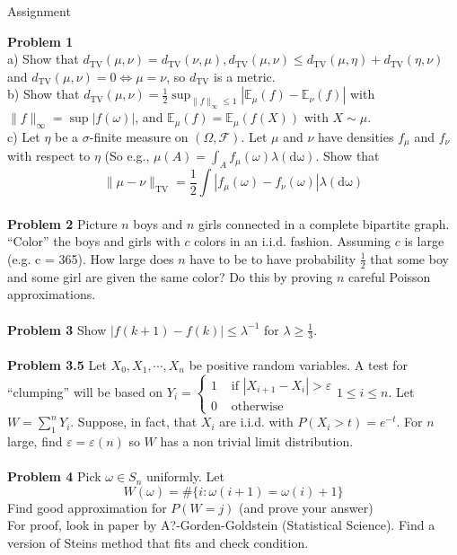 \documentclass[12pt]{article}
\begin{document}
\begin{center}
Assignment
\end{center}
\textbf{Problem 1}\\
a) Show that $d_{\text{TV}}(\mu, \nu) = d_{\text{TV}}(\nu, \mu), d_{\text{TV}}(\mu, \nu) \leqslant d_{\text{TV}}(\mu, \eta) + d_{\text{TV}}(\eta, \nu)$ and $d_{\text{TV}}(\mu, \nu) = 0 \Leftrightarrow \mu = \nu$, so $d_{\text{TV}}$ is a metric.\\
b) Show that $d_{\text{TV}}(\mu, \nu) = \frac{1}{2}\sup_{\|f\|_{\infty} \leqslant 1}|\mathbb{E}_{\mu}(f) - \mathbb{E}_{\nu}(f)|$ with $\|f\|_{\infty} = \sup|f(\omega)|$, and $\mathbb{E}_{\mu}(f) = \mathbb{E}_{\mu}\left(f(X)\right)$ with $X \sim \mu$.\\
c) Let $\eta$ be a $\sigma$-finite measure on $(\Omega, \mathcal{F})$. Let $\mu$ and $\nu$ have densities $f_{\mu}$ and $f_{\nu}$ with respect to $\eta$ (So e.g., $\mu(A) = \int_A f_{\mu}(\omega) \lambda(\mathrm{d\omega})$. Show that
$$\|\mu - \nu\|_{\text{TV}} = \frac{1}{2}\int|f_{\mu}(\omega) - f_{\nu}(\omega)|\lambda(\mathrm{d\omega})$$
\\
\textbf{Problem 2} Picture $n$ boys and $n$ girls connected in a complete bipartite graph. ``Color'' the boys and girls with $c$ colors in an i.i.d. fashion. Assuming $c$ is large (e.g. c = 365). How large does $n$ have to be to have probability $\frac{1}{2}$ that some boy and some girl are given the same color? Do this by proving $n$ careful Poisson approximations.\\
\\
\textbf{Problem 3} Show $|f(k + 1) - f(k)| \leqslant \lambda^{-1}$ for $\lambda \geqslant \frac{1}{3}$.\\
\\
\textbf{Problem 3.5} Let $X_0, X_1, \cdots, X_n$ be positive random variables. A test for ``clumping'' will be based on $Y_i = \begin{cases}
1 & \text{ if }|X_{i + 1} - X_i| > \varepsilon\\
	0 & \text{ otherwise}
\end{cases}
1 \leqslant i \leqslant n$. Let $W = \sum_1^n Y_i$. Suppose, in fact, that $X_i$ are i.i.d. with $P(X_i > t) = e^{-t}$. For $n$ large, find $\varepsilon = \varepsilon(n)$ so $W$ has a non trivial limit distribution.\\
\\
\textbf{Problem 4} Pick $\omega \in S_n$ uniformly. Let
$$W(\omega) = \#\{i: \omega(i + 1) = \omega(i) + 1\}$$
Find good approximation for $P(W = j)$ (and prove your answer)\\
For proof, look in paper by A?-Gorden-Goldstein (Statistical Science). Find a version of Steins method that fits and check condition.\\
\end{document}
